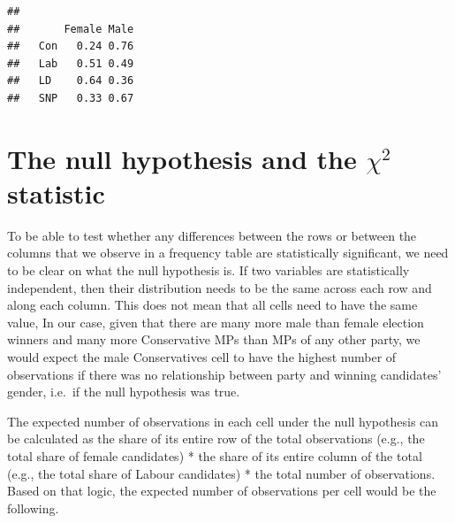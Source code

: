 \documentclass[
]{book}
\newenvironment{Shaded}{\begin{snugshade}}{\end{snugshade}}
\newcommand{\CommentTok}[1]{\textcolor[rgb]{0.56,0.35,0.01}{\textit{#1}}}
\newcommand{\DataTypeTok}[1]{\textcolor[rgb]{0.13,0.29,0.53}{#1}}
\newcommand{\DecValTok}[1]{\textcolor[rgb]{0.00,0.00,0.81}{#1}}
\newcommand{\KeywordTok}[1]{\textcolor[rgb]{0.13,0.29,0.53}{\textbf{#1}}}
\newcommand{\NormalTok}[1]{#1}
\newcommand{\OperatorTok}[1]{\textcolor[rgb]{0.81,0.36,0.00}{\textbf{#1}}}
\newcommand{\StringTok}[1]{\textcolor[rgb]{0.31,0.60,0.02}{#1}}
\begin{document}
\begin{Shaded}
\end{Shaded}

\begin{verbatim}
##      
##       Female Male
##   Con   0.24 0.76
##   Lab   0.51 0.49
##   LD    0.64 0.36
##   SNP   0.33 0.67
\end{verbatim}

\hypertarget{the-null-hypothesis-and-the-chi2-statistic}{%
\section{\texorpdfstring{The null hypothesis and the \(\chi^2\) statistic}{The null hypothesis and the \textbackslash chi\^{}2 statistic}}\label{the-null-hypothesis-and-the-chi2-statistic}}

To be able to test whether any differences between the rows or between the columns that we observe in a frequency table are statistically significant, we need to be clear on what the null hypothesis is. If two variables are statistically independent, then their distribution needs to be the same across each row and along each column. This does not mean that all cells need to have the same value, In our case, given that there are many more male than female election winners and many more Conservative MPs than MPs of any other party, we would expect the male Conservatives cell to have the highest number of observations if there was no relationship between party and winning candidates' gender, i.e.~if the null hypothesis was true.

The expected number of observations in each cell under the null hypothesis can be calculated as the share of its entire row of the total observations (e.g., the total share of female candidates) * the share of its entire column of the total (e.g., the total share of Labour candidates) * the total number of observations. Based on that logic, the expected number of observations per cell would be the following.
\end{document}
